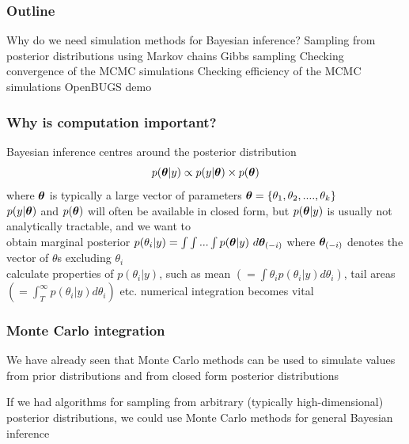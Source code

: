 \begin{frame}
\frametitle{Outline}
\bi
\I Why do we need simulation methods for Bayesian inference?\vspace{2mm}
\I Sampling from posterior distributions using Markov chains\vspace{2mm}
\I Gibbs sampling\vspace{2mm}
\I Checking convergence of the MCMC simulations\vspace{2mm}
\I Checking efficiency of the MCMC simulations\vspace{2mm}
\I OpenBUGS demo
\ei

\end{frame}

\begin{frame}

\frametitle{Why is computation important?}

\bibig
\I Bayesian inference centres around the posterior distribution
   $$p(\boldsymbol{\theta} |y) \propto p(y|\boldsymbol{\theta}) \times p(\boldsymbol{\theta})$$
   where $\boldsymbol{\theta}$ is typically a large vector of parameters
   $\boldsymbol{\theta} = \left\{\theta_1, \theta_2,....,\theta_k\right\}$\\ \vspace{2mm}
\I $p(y|\boldsymbol{\theta})$ and $p(\boldsymbol{\theta})$ will often be available in
   closed form, but $p(\boldsymbol{\theta} |y)$ is usually not analytically
   tractable, and we want to \\ \vspace{1mm}
   \nestedbi
   \I obtain marginal posterior $p(\theta_i |y)= \int\int...\int p(\boldsymbol{\theta}|y)\,\, d\boldsymbol{\theta}_{(-i)}$
      where $\boldsymbol{\theta}_{(-i)}$ denotes the vector of $\theta$s excluding $\theta_i$\\ \vspace{2mm}
   \I calculate properties of $p(\theta_i |y)$, such as mean
   $(=\int \theta_i p(\theta_i|y) d\theta_i)$, tail areas
   $(=\int_T^{\infty} p(\theta_i|y) d\theta_i)$ etc.\vspace{2mm}
   \nestedei
\I[$\rightarrow$] numerical integration becomes vital \eibig

\end{frame}

\begin{frame}

\frametitle{Monte Carlo integration}

\bi
\I We have already seen that Monte Carlo methods can be used to
simulate values from prior distributions and from \alert{closed form}
posterior distributions \\ \vspace{2mm}

\I If we had algorithms for sampling from arbitrary (typically
high-dimensional) posterior distributions, we could use Monte Carlo
methods for general Bayesian inference
\ei

\end{frame}

